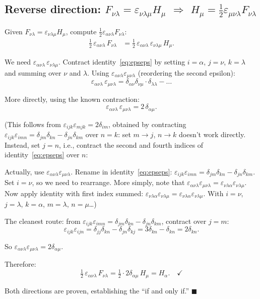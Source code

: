 \documentclass[12pt]{article}
\begin{document}
\subsection*{Reverse direction: $F_{\nu\lambda} = \varepsilon_{\nu\lambda\mu}H_\mu$ $\Longrightarrow$ $H_\mu = \tfrac{1}{2}\varepsilon_{\mu\nu\lambda}F_{\nu\lambda}$}

Given $F_{\nu\lambda} = \varepsilon_{\nu\lambda\mu}H_\mu$, compute $\tfrac{1}{2}\varepsilon_{\alpha\nu\lambda}F_{\nu\lambda}$:
\begin{align}
\tfrac{1}{2}\,\varepsilon_{\alpha\nu\lambda}\,F_{\nu\lambda} &= \tfrac{1}{2}\,\varepsilon_{\alpha\nu\lambda}\,\varepsilon_{\nu\lambda\mu}\,H_\mu.
\end{align}

We need $\varepsilon_{\alpha\nu\lambda}\,\varepsilon_{\nu\lambda\mu}$. Contract identity~\eqref{eq:epseps} by setting $i = \alpha$, $j = \nu$, $k = \lambda$ and summing over $\nu$ and $\lambda$. Using $\varepsilon_{\alpha\nu\lambda}\varepsilon_{\mu\nu\lambda}$ (reordering the second epsilon):
\[
\varepsilon_{\alpha\nu\lambda}\,\varepsilon_{\mu\nu\lambda} = \delta_{\alpha\nu}\delta_{\nu\mu}\cdot\delta_{\lambda\lambda} - \ldots
\]

More directly, using the known contraction:
\[
\varepsilon_{\alpha\nu\lambda}\,\varepsilon_{\mu\nu\lambda} = 2\,\delta_{\alpha\mu}.
\]

(This follows from $\varepsilon_{i j k}\varepsilon_{m j k} = 2\delta_{im}$, obtained by contracting $\varepsilon_{ijk}\varepsilon_{imn} = \delta_{jm}\delta_{kn} - \delta_{jn}\delta_{km}$ over $n = k$: set $m \to j$, $n \to k$ doesn't work directly. Instead, set $j=n$, i.e., contract the second and fourth indices of identity~\eqref{eq:epseps} over $n$:

Actually, use $\varepsilon_{\alpha\nu\lambda}\varepsilon_{\mu\nu\lambda}$. Rename in identity~\eqref{eq:epseps}: $\varepsilon_{ijk}\varepsilon_{imn} = \delta_{jm}\delta_{kn} - \delta_{jn}\delta_{km}$. Set $i = \nu$, so we need to rearrange. More simply, note that $\varepsilon_{\alpha\nu\lambda}\varepsilon_{\mu\nu\lambda} = \varepsilon_{\nu\lambda\alpha}\varepsilon_{\nu\lambda\mu}$. Now apply identity with first index summed: $\varepsilon_{\nu\lambda\alpha}\varepsilon_{\nu\lambda\mu} = \varepsilon_{\nu\lambda\alpha}\varepsilon_{\nu\lambda\mu}$. With $i = \nu$, $j = \lambda$, $k = \alpha$, $m = \lambda$, $n = \mu$\ldots)

The cleanest route: from $\varepsilon_{ijk}\varepsilon_{imn} = \delta_{jm}\delta_{kn} - \delta_{jn}\delta_{km}$, contract over $j = m$:
\[
\varepsilon_{ijk}\varepsilon_{ijn} = \delta_{jj}\delta_{kn} - \delta_{jn}\delta_{kj} = 3\delta_{kn} - \delta_{kn} = 2\delta_{kn}.
\]

So $\varepsilon_{\alpha\nu\lambda}\varepsilon_{\mu\nu\lambda} = 2\delta_{\alpha\mu}$.

Therefore:
\[
\tfrac{1}{2}\,\varepsilon_{\alpha\nu\lambda}\,F_{\nu\lambda} = \tfrac{1}{2}\cdot 2\delta_{\alpha\mu}\,H_\mu = H_\alpha. \quad \checkmark
\]

\bigskip
Both directions are proven, establishing the ``if and only if.'' \hfill $\blacksquare$
\end{document}
